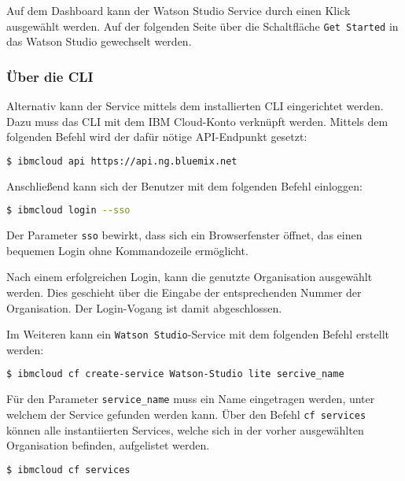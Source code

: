 Auf dem Dashboard kann der Watson Studio Service durch einen Klick ausgewählt werden. Auf der folgenden Seite über die
Schaltfläche \texttt{Get Started} in das Watson Studio gewechselt werden.

\subsubsection*{Über die CLI}
Alternativ kann der Service mittels dem installierten CLI eingerichtet werden. Dazu muss das CLI mit dem IBM
Cloud-Konto verknüpft werden. Mittels dem folgenden Befehl wird der dafür nötige API-Endpunkt gesetzt:

\begin{lstlisting}[language=bash, caption=Setzen des API Targets, label=Setzen des API Targets]
    $ ibmcloud api https://api.ng.bluemix.net
\end{lstlisting}

Anschließend kann sich der Benutzer mit dem folgenden Befehl einloggen:

\begin{lstlisting}[language=bash, caption=Login über CLI und Single Sign-on, label=Login über CLI und SSO]
    $ ibmcloud login --sso
\end{lstlisting}

Der Parameter \texttt{sso} bewirkt, dass sich ein Browserfenster öffnet, das einen bequemen Login ohne Kommandozeile
ermöglicht.

Nach einem erfolgreichen Login, kann die genutzte Organisation ausgewählt werden. Dies geschieht über die Eingabe der
entsprechenden Nummer der Organisation. Der Login-Vogang ist damit abgeschlossen.

Im Weiteren kann ein \texttt{Watson Studio}-Service mit dem folgenden Befehl erstellt werden:

\begin{lstlisting}[language=bash, caption=Instanziierung des Watson Studio Services, label=Instanziierung des Watson Studio Services]
    $ ibmcloud cf create-service Watson-Studio lite sercive_name
\end{lstlisting}

Für den Parameter \texttt{service\_name} muss ein Name eingetragen werden, unter welchem der Service gefunden werden kann.
Über den Befehl \texttt{cf services} können alle instantiierten Services, welche sich in der vorher ausgewählten
Organisation befinden, aufgelistet werden.

\begin{lstlisting}[language=bash, caption=Auflisten aller Services, label=Auflisten aller Services]
    $ ibmcloud cf services
\end{lstlisting}

